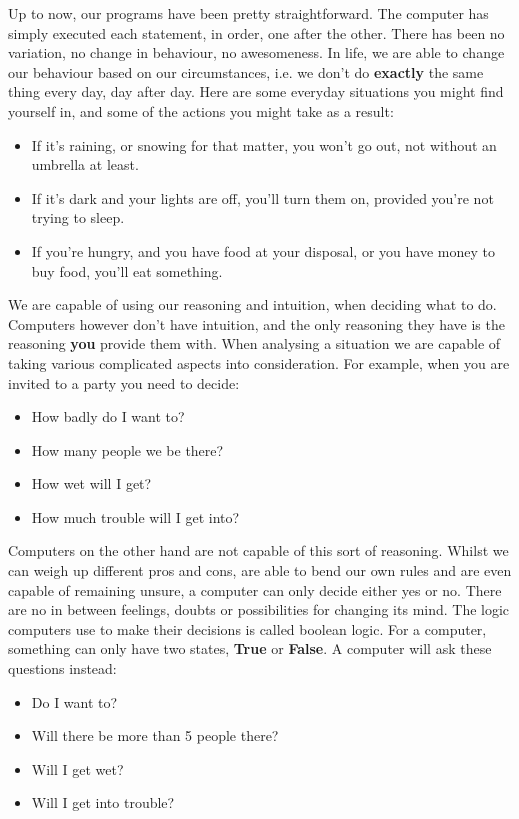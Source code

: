 
 Up to now, our programs have been pretty straightforward. The computer has simply executed each statement, in order, one after the other. There has been no variation, no change in behaviour, no awesomeness. In life, we are able to change our behaviour based on our circumstances, i.e. we don't do \textbf{exactly} the same thing every day, day after day. Here are some everyday situations you might find yourself in, and some of the actions you might take as a  result:
\begin{itemize}
	\item If it's raining, or snowing for that matter, you won't go out, not without an umbrella at least.
	\item If it's dark and your lights are off, you'll turn them on, provided you're not trying to sleep.
	\item If you're hungry, and you have food at your disposal, or you have money to buy food, you'll eat something.
\end{itemize}

We are capable of using our reasoning and intuition, when deciding what to do. Computers however don't have intuition, and the only reasoning they have is the reasoning \textbf{you} provide them with.   When analysing a situation we are capable of taking various complicated aspects into consideration. For example, when you are invited to a party you need to decide:
\begin{itemize}
	\item  How badly do I want to?
	\item  How many people we be there?
	\item  How wet will I get?
	\item  How much trouble will I get into?
\end{itemize}

 Computers on the other hand are not capable of this sort of reasoning. Whilst we can weigh up different pros and cons, are able to bend our own rules and are even capable of remaining unsure, a computer can only decide either yes or no. There are no in between feelings, doubts or possibilities for changing its mind.   The logic computers use to make their decisions is called boolean logic. For a computer, something can only have two states, \textbf{True} or \textbf{ False}. A computer will ask these questions instead:
\begin{itemize}
	\item  Do I want to?
	\item  Will there be more than 5 people there?
	\item  Will I get wet?
	\item  Will I get into trouble?
\end{itemize}

